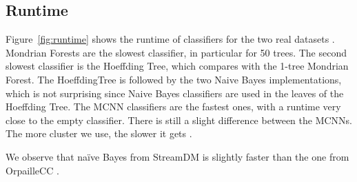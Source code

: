 \subsection{Runtime}
Figure~\ref{fig:runtime} shows the runtime of classifiers for the two real
datasets . Mondrian Forests are the slowest classifier, in particular for
50 trees. The second slowest classifier is the Hoeffding Tree, which
compares with the 1-tree Mondrian Forest. The HoeffdingTree is followed by
the two Naive Bayes implementations, which is not surprising since Naive
Bayes classifiers are used in the leaves of the Hoeffding Tree. The MCNN
classifiers are the fastest ones, with a runtime very close to the empty
classifier. There is still a slight difference between the MCNNs. The more
cluster we use, the slower it gets .

We observe that naïve Bayes from StreamDM is slightly faster than the one
from OrpailleCC .

